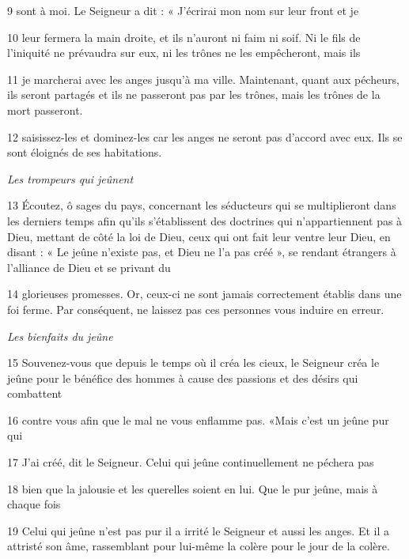 \par 9 sont à moi. Le Seigneur a dit : « J'écrirai mon nom sur leur front et je

\par 10 leur fermera la main droite, et ils n'auront ni faim ni soif. Ni le fils de l'iniquité ne prévaudra sur eux, ni les trônes ne les empêcheront, mais ils

\par 11 je marcherai avec les anges jusqu'à ma ville. Maintenant, quant aux pécheurs, ils seront partagés et ils ne passeront pas par les trônes, mais les trônes de la mort passeront.

\par 12 saisissez-les et dominez-les car les anges ne seront pas d'accord avec eux. Ils se sont éloignés de ses habitations.

\par \textit{Les trompeurs qui jeûnent}

\par 13 Écoutez, ô sages du pays, concernant les séducteurs qui se multiplieront dans les derniers temps afin qu'ils s'établissent des doctrines qui n'appartiennent pas à Dieu, mettant de côté la loi de Dieu, ceux qui ont fait leur ventre leur Dieu, en disant : « Le jeûne n'existe pas, et Dieu ne l'a pas créé », se rendant étrangers à l'alliance de Dieu et se privant du

\par 14 glorieuses promesses. Or, ceux-ci ne sont jamais correctement établis dans une foi ferme. Par conséquent, ne laissez pas ces personnes vous induire en erreur.

\par \textit{Les bienfaits du jeûne}

\par 15 Souvenez-vous que depuis le temps où il créa les cieux, le Seigneur créa le jeûne pour le bénéfice des hommes à cause des passions et des désirs qui combattent

\par 16 contre vous afin que le mal ne vous enflamme pas. «Mais c'est un jeûne pur qui

\par 17 J'ai créé, dit le Seigneur. Celui qui jeûne continuellement ne péchera pas

\par 18 bien que la jalousie et les querelles soient en lui. Que le pur jeûne, mais à chaque fois

\par 19 Celui qui jeûne n'est pas pur il a irrité le Seigneur et aussi les anges. Et il a attristé son âme, rassemblant pour lui-même la colère pour le jour de la colère.

